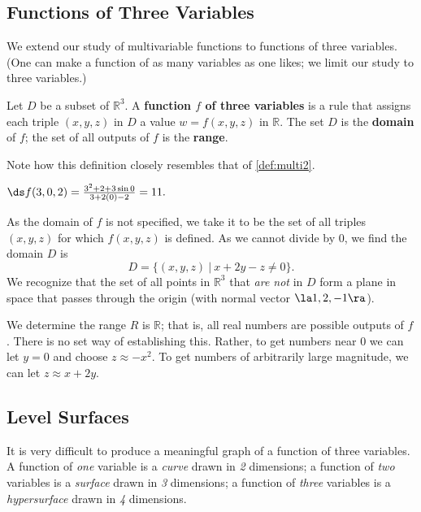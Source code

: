 \subsection*{Functions of Three Variables}

We extend our study of multivariable functions to functions of three variables. (One can make a function of as many variables as one likes; we limit our study to three variables.)

{Let $D$ be a subset of $\mathbb{R}^3$. A \textbf{function $f$ of three variables} is a rule that assigns each triple $(x,y,z)$ in $D$ a value $w=f(x,y,z)$ in $\mathbb{R}$. The set $D$ is the \textbf{domain} of $f$; the set of all outputs of $f$ is the \textbf{range}.
}

Note how this definition closely resembles that of \autoref{def:multi2}.

{$\ds f(3,0,2) = \frac{3^2+2+3\sin 0}{3+2(0)-2} = 11.$

As the domain of $f$ is not specified, we take it to be the set of all triples $(x,y,z)$ for which $f(x,y,z)$ is defined. As we cannot divide by $0$, we find the domain $D$ is 
$$D = \{(x,y,z)\ |\ x+2y-z\neq 0\}.$$
We recognize that the set of all points in $\mathbb{R}^3$ that \textit{are not} in $D$ form a plane in space that passes through the origin (with normal vector $\la 1,2,-1\ra$). 

We determine the range $R$ is $\mathbb{R}$; that is, all real numbers are possible outputs of $f$. There is no set way of establishing this. Rather, to get numbers near 0 we can let $y=0$ and choose $z \approx -x^2$. To get numbers of arbitrarily large magnitude, we can let $z\approx x+2y$. }

\subsection*{Level Surfaces}

It is very difficult to produce a meaningful graph of a function of three variables. A function of \textit{one} variable is a \textit{curve} drawn in \textit{2} dimensions; a function of \textit{two} variables is a \textit{surface} drawn in \textit{3} dimensions; a function of \textit{three} variables is a \textit{hypersurface} drawn in \textit{4} dimensions.

